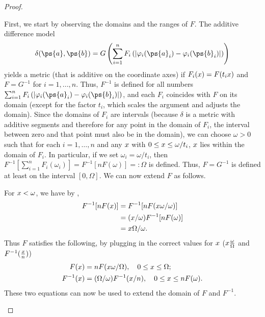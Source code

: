 \begin{proof}
\begin{proofpart}
		First, we start by observing the domains and the ranges of $F$.
		The additive difference model
		\begin{equation*}
			\delta(\ps{a}, \ps{b}) = G \left( \sum_{i=1}^{n} F_i \left( |\varphi_i(\ps{a}_i) - \varphi_i(\ps{b}_i)| \right) \right)
		\end{equation*}
		yields a metric (that is additive on the coordinate axes) if $F_i(x) = F(t_i x)$ and $F = G^{-1}$ for $i=1, ..., n$. Thus, $F^{-1}$ is defined for all numbers $\sum_{i=1}^{n} F_i \left( |\varphi_i(\ps{a}_i) - \varphi_i(\ps{b}_i)| \right)$, and each $F_i$ coincides with $F$ on its domain (except for the factor $t_i$, which scales the argument and adjusts the domain).
		Since the domains of $F_i$ are intervals (because $\delta$ is a metric with additive segments and therefore for any point in the domain of $F_i$, the interval between zero and that point must also be in the domain), we can choose $\omega > 0$ such that for each $i = 1, \ldots, n$ and any $x$ with $0 \leq x \leq \omega/t_i$, $x$ lies within the domain of $F_i$.
		In particular, if we set $\omega_i = \omega/t_i$, then $F^{-1} \left[ \sum_{i=1}^{n} F_i(\omega_i) \right] = F^{-1} \left[ nF(\omega) \right] =: \Omega$ is defined. Thus, $F = G^{-1}$ is defined at least on the interval $[0, \Omega]$. We can now extend $F$ as follows.
	\end{proofpart}
	\begin{proofpart}
		For $x < \omega$, we have by ,
		\begin{align*}
			F^{-1}[nF(x)] & = F^{-1}[nF(x \omega/\omega)]   \\
			                & = (x/\omega) F^{-1}[nF(\omega)] \\
			                & = x \Omega/\omega.
		\end{align*}
		Thus $F$ satisfies the following, by plugging in the correct values for $x$ ($x \frac{\omega}{\Omega}$ and $F^{-1}( \frac{x}{n} )$)
		\begin{align}
			F(x)      & = nF(x \omega/\Omega), \quad 0 \leq x \leq \Omega; \label{proof-f-erw}               \\
			F^{-1}(x) & = (\Omega/\omega) F^{-1}(x/n), \quad 0 \leq x \leq nF(\omega). \label{proof-f-1-erw}
		\end{align}
		These two equations can now be used to extend the domain of $F$ and $F^{-1}$.


\end{proofpart}
\end{proof}
